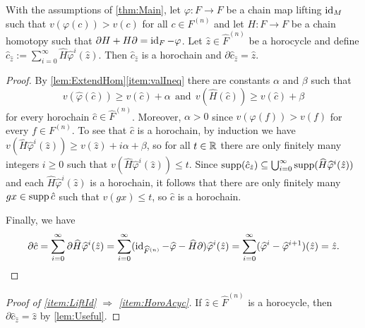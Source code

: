 \documentclass[11pt, letterpaper]{amsart}
\begin{document}
\begin{lem}\label{lem:Useful}
With the assumptions of \cref{thm:Main}, let $\varphi \colon F \longrightarrow F$ be a chain map lifting $\operatorname{id}_M$ such that $v(\varphi(c)) > v(c)$ for all $c \in F^{(n)}$ and let $H \colon F \longrightarrow F$ be a chain homotopy such that $\partial H + H \partial = \operatorname{id}_{F} - \varphi$. Let $\hat{z} \in \widehat{F}^{(n)}$ be a horocycle and define $\hat{c}_{\hat{z}} := \sum_{i = 0}^\infty \widehat{H} \widehat{\varphi}^i(\hat{z})$. Then $\hat{c}_{\hat{z}}$ is a horochain and $\partial \hat{c}_{\hat{z}} = \hat{z}$.
\end{lem}

\begin{proof}
By \cref{lem:ExtendHom}\ref{item:valIneq} there are constants $\alpha$ and $\beta$ such that
\[
    v(\widehat{\varphi}(\hat{c})) \geqslant v(\hat{c}) + \alpha \ \ \text{and} \ \ v(\widehat{H}(\hat{c})) \geqslant v(\hat{c}) + \beta
\]
for every horochain $\hat{c} \in \widehat{F}^{(n)}$. Moreover, $\alpha > 0$ since $v(\varphi(f)) > v(f)$ for every $f \in F^{(n)}$. To see that $\hat{c}$ is a horochain, by induction we have $v(\widehat{H}\widehat{\varphi}^i(\hat{z})) \geqslant v(\hat{z}) + i\alpha + \beta$, so for all $t \in \mathbb{R}$ there are only finitely many integers $i \geqslant 0$ such that $v(\widehat{H} \widehat{\varphi}^i(\hat{z})) \leqslant t$. Since $\operatorname{supp}(\hat{c}_{\hat{z}}) \subseteq \bigcup_{i=0}^\infty \operatorname{supp}(\widehat{H}\widehat{\varphi}^i(\hat{z}))$ and each $\widehat{H} \widehat{\varphi}^i(\hat{z})$ is a horochain, it follows that there are only finitely many $gx \in \operatorname{supp} \hat{c}$ such that $v(gx) \leqslant t$, so $\hat{c}$ is a horochain.

Finally, we have
\begin{equation*}
    \partial\hat{c} = \sum_{i=0}^\infty \partial \widehat{H} \widehat{\varphi}^i(\hat{z}) = \sum_{i=0}^\infty (\operatorname{id}_{\widehat{F}^{(n)}} - \widehat{\varphi} - \widehat{H}\partial)\widehat{\varphi}^i(\hat{z}) = \sum_{i=0}^\infty (\widehat{\varphi}^i - \widehat{\varphi}^{i+1})(\hat{z}) = \hat{z}. \qedhere
\end{equation*}
\end{proof}




\begin{proof}[Proof of \ref{item:LiftId} $\Longrightarrow$ \ref{item:HoroAcyc}]
If $\hat{z} \in \widehat{F}^{(n)}$ is a horocycle, then $\partial \hat{c}_{\hat{z}} = \hat z$ by \cref{lem:Useful}. 
\end{proof}
\end{document}
